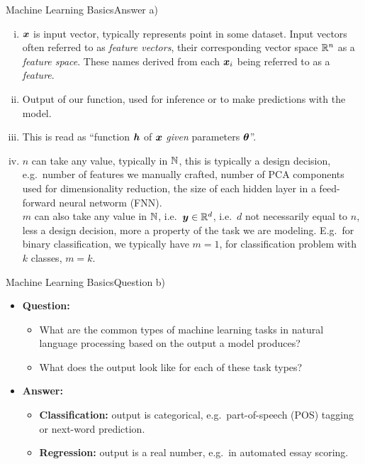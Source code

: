 \documentclass[t]{beamer}
\begin{document}
\begin{frame}{Machine Learning Basics}{Answer a)}
    \begin{enumerate}[(i)]
        \item ${\boldsymbol{x}}$ is input vector, typically represents point in some dataset.
              Input vectors often referred to as \emph{feature vectors}, their
              corresponding vector space $\mathbb{R}^n$ as a \emph{feature space}.
              These names derived from each ${\boldsymbol{x}}_i$ being referred to
              as a \emph{feature}.
        \item Output of our function, used for inference or to make
              predictions with the model.
        \item This is read as ``function ${\boldsymbol{h}}$ of ${\boldsymbol{x}}$ \emph{given}
              parameters ${\boldsymbol{\theta}}$''.
        \item $n$ can take any value, typically in $\mathbb{N}$, this is
              typically a design decision, e.g.\ number of features we
              manually crafted, number of PCA components used for
              dimensionality reduction, the size of each hidden layer
              in  a feed-forward neural networm (FNN). \\
              $m$ can also take any value in $\mathbb{N}$, i.e.\
              ${\boldsymbol{y}}\in\mathbb{R}^d$, i.e.\ $d$ not necessarily equal to
              $n$, less a design decision, more a property of
              the task we are modeling. E.g.\ for binary classification,
              we typically have $m=1$, for classification
              problem with $k$ classes, $m=k$.
    \end{enumerate}
\end{frame}

\begin{frame}{Machine Learning Basics}{Question b)}
    \begin{itemize}
        \item \textbf{Question:}
              \begin{itemize}
                  \item What are the common types of machine learning tasks in
                        natural language processing based on the output a model
                        produces?
                  \item What does the output look like for each of these task
                        types?
              \end{itemize}
              \pause
        \item \textbf{Answer:}
              \begin{itemize}
                  \item \textbf{Classification:} output is categorical, e.g.\
                        part-of-speech (POS) tagging or next-word prediction.
                  \item \textbf{Regression:} output is a real number, e.g.\ in
                        automated essay scoring.
              \end{itemize}
    \end{itemize}
\end{frame}
\end{document}
